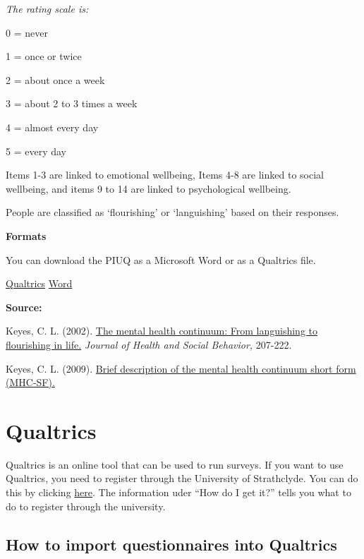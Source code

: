 \documentclass[
]{book}
\begin{document}
\emph{The rating scale is:}

0 = never

1 = once or twice

2 = about once a week

3 = about 2 to 3 times a week

4 = almost every day

5 = every day

Items 1-3 are linked to emotional wellbeing, Items 4-8 are linked to social wellbeing, and items 9 to 14 are linked to psychological wellbeing.

People are classified as `flourishing' or `languishing' based on their responses.

\textbf{Formats}

You can download the PIUQ as a Microsoft Word or as a Qualtrics file.

\href{link}{Qualtrics} \textbar{}
\href{link}{Word}

\textbf{Source:}

Keyes, C. L. (2002). \href{https://www.researchgate.net/profile/Corey_Keyes/publication/11278728_The_Mental_Health_Continuum_From_Languishing_to_Flourishing_in_Life/links/0046352b1a6f89da77000000/The-Mental-Health-Continuum-From-Languishing-to-Flourishing-in-Life.pdf}{The mental health continuum: From languishing to flourishing in life.} \emph{Journal of Health and Social Behavior,} 207-222.

Keyes, C. L. (2009). \href{https://www.aacu.org/sites/default/files/MHC-SFEnglish.pdf}{Brief description of the mental health continuum short form (MHC-SF).}

\hypertarget{qualtrics}{%
\chapter{Qualtrics}\label{qualtrics}}

Qualtrics is an online tool that can be used to run surveys. If you want to use Qualtrics, you need to register through the University of Strathclyde. You can do this by clicking \href{https://www.strath.ac.uk/is/software/qualtrics/}{here}. The information uder ``How do I get it?'' tells you what to do to register through the university.

\hypertarget{how-to-import-questionnaires-into-qualtrics}{%
\section{How to import questionnaires into Qualtrics}\label{how-to-import-questionnaires-into-qualtrics}}
\end{document}
